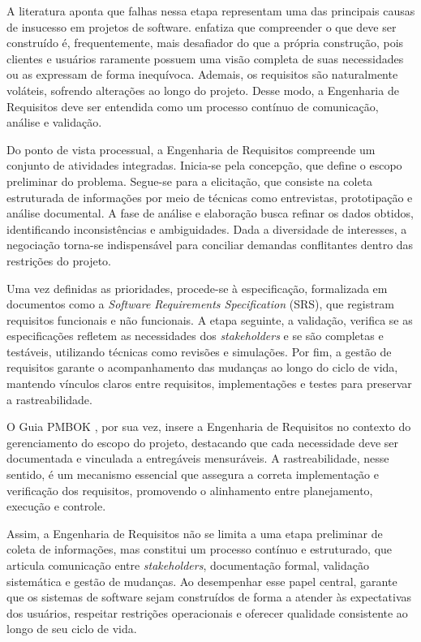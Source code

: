 A literatura aponta que falhas nessa etapa representam uma das principais causas de insucesso em projetos de software.  enfatiza que compreender o que deve ser construído é, frequentemente, mais desafiador do que a própria construção, pois clientes e usuários raramente possuem uma visão completa de suas necessidades ou as expressam de forma inequívoca. Ademais, os requisitos são naturalmente voláteis, sofrendo alterações ao longo do projeto. Desse modo, a Engenharia de Requisitos deve ser entendida como um processo contínuo de comunicação, análise e validação.

Do ponto de vista processual, a Engenharia de Requisitos compreende um conjunto de atividades integradas. Inicia-se pela concepção, que define o escopo preliminar do problema. Segue-se para a elicitação, que consiste na coleta estruturada de informações por meio de técnicas como entrevistas, prototipação e análise documental. A fase de análise e elaboração busca refinar os dados obtidos, identificando inconsistências e ambiguidades. Dada a diversidade de interesses, a negociação torna-se indispensável para conciliar demandas conflitantes dentro das restrições do projeto.

Uma vez definidas as prioridades, procede-se à especificação, formalizada em documentos como a \textit{Software Requirements Specification} (SRS), que registram requisitos funcionais e não funcionais. A etapa seguinte, a validação, verifica se as especificações refletem as necessidades dos \textit{stakeholders} e se são completas e testáveis, utilizando técnicas como revisões e simulações. Por fim, a gestão de requisitos garante o acompanhamento das mudanças ao longo do ciclo de vida, mantendo vínculos claros entre requisitos, implementações e testes para preservar a rastreabilidade.

O Guia PMBOK \cite{pmi2008}, por sua vez, insere a Engenharia de Requisitos no contexto do gerenciamento do escopo do projeto, destacando que cada necessidade deve ser documentada e vinculada a entregáveis mensuráveis. A rastreabilidade, nesse sentido, é um mecanismo essencial que assegura a correta implementação e verificação dos requisitos, promovendo o alinhamento entre planejamento, execução e controle.

Assim, a Engenharia de Requisitos não se limita a uma etapa preliminar de coleta de informações, mas constitui um processo contínuo e estruturado, que articula comunicação entre \textit{stakeholders}, documentação formal, validação sistemática e gestão de mudanças. Ao desempenhar esse papel central, garante que os sistemas de software sejam construídos de forma a atender às expectativas dos usuários, respeitar restrições operacionais e oferecer qualidade consistente ao longo de seu ciclo de vida.

